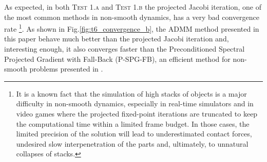 \documentclass[AMA,STIX1COL]{WileyNJD-v2}
\begin{document}
As expected, in both \textsc{Test 1.a} and \textsc{Test 1.b} the projected Jacobi iteration, one of the most common
methods in non-smooth dynamics, has a very bad convergence rate \footnote{It is a known fact that the simulation 
of high stacks of objects is a major difficulty in non-smooth dynamics, especially in real-time simulators
and in video games where the projected fixed-point iterations are truncated to keep the computational
time within a limited frame budget. In those cases, the limited precision of the solution will lead to underestimated
contact forces, undesired slow interpenetration of the parts and, ultimately, to unnatural collapses of stacks.}.
As shown in Fig.\ref{fig:t6_convergence_b}, 
the ADMM method presented in this paper behave
much better than the projected Jacobi iteration and, interesting enough, it also converges faster
than the Preconditioned Spectral Projected Gradient with Fall-Back (P-SPG-FB), an
efficient method for non-smooth problems presented in \cite{hammadTOG2015}.
\end{document}
